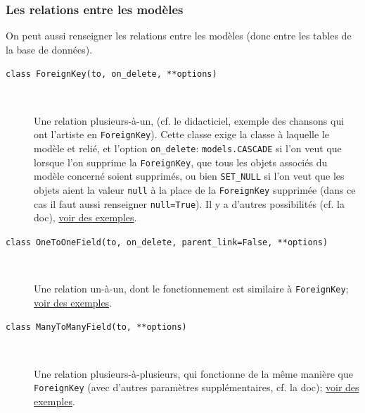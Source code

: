 \documentclass[a4paper, 10pt]{article}
\begin{document}
\subsubsection{Les relations entre les modèles}

On  peut aussi renseigner les relations entre les modèles (donc entre les tables de la base de données).
\begin{description}
    \item[\texttt{class ForeignKey(to, on_delete, **options)}]~

          Une relation plusieurs-à-un, (cf. le didacticiel, exemple des chansons qui ont l'artiste en \texttt{ForeignKey}). Cette classe exige la classe à laquelle le modèle et relié, et l'option \texttt{on_delete}: \texttt{models.CASCADE} si l'on veut que lorsque l'on supprime la \texttt{ForeignKey}, que tous les objets associés du modèle concerné soient supprimés, ou bien \texttt{SET_NULL} si l'on veut que les objets aient la valeur \texttt{null} à la place de la \texttt{ForeignKey} supprimée (dans ce cas il faut aussi renseigner \texttt{null=True}). Il y a d'autres possibilités (cf. la doc), \href{https://docs.djangoproject.com/fr/2.2/topics/db/examples/many_to_one/}{voir des exemples}.

    \item[\texttt{class OneToOneField(to, on_delete, parent_link=False, **options)}]~

          Une relation un-à-un, dont le fonctionnement est similaire à \texttt{ForeignKey}; \href{https://docs.djangoproject.com/fr/2.2/topics/db/examples/one_to_one/}{voir des exemples}.

    \item[\texttt{class ManyToManyField(to, **options)}]~

          Une relation plusieurs-à-plusieurs, qui fonctionne de la même manière que \texttt{ForeignKey} (avec d'autres paramètres supplémentaires, cf. la doc); \href{https://docs.djangoproject.com/fr/2.2/topics/db/examples/many_to_many/}{voir des exemples}.
\end{description}
\end{document}
